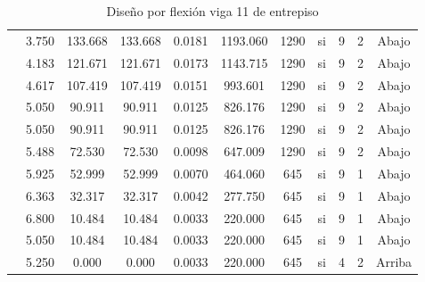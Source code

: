 \begin{table}[H]
{\begin{tabular}{|c|c|c|c|c|c|c|c|c|c|c|}
\cline{2-11}          & 3.750 & 133.668 & 133.668 & 0.0181 & 1193.060 & 1290  & si    & 9     & 2     & Abajo \bigstrut\\
\cline{2-11}          & 4.183 & 121.671 & 121.671 & 0.0173 & 1143.715 & 1290  & si    & 9     & 2     & Abajo \bigstrut\\
\cline{2-11}          & 4.617 & 107.419 & 107.419 & 0.0151 & 993.601 & 1290  & si    & 9     & 2     & Abajo \bigstrut\\
\cline{2-11}          & 5.050 & 90.911 & 90.911 & 0.0125 & 826.176 & 1290  & si    & 9     & 2     & Abajo \bigstrut\\
\cline{2-11}          & 5.050 & 90.911 & 90.911 & 0.0125 & 826.176 & 1290  & si    & 9     & 2     & Abajo \bigstrut\\
\cline{2-11}          & 5.488 & 72.530 & 72.530 & 0.0098 & 647.009 & 1290  & si    & 9     & 2     & Abajo \bigstrut\\
\cline{2-11}          & 5.925 & 52.999 & 52.999 & 0.0070 & 464.060 & 645   & si    & 9     & 1     & Abajo \bigstrut\\
\cline{2-11}          & 6.363 & 32.317 & 32.317 & 0.0042 & 277.750 & 645   & si    & 9     & 1     & Abajo \bigstrut\\
\cline{2-11}          & 6.800 & 10.484 & 10.484 & 0.0033 & 220.000 & 645   & si    & 9     & 1     & Abajo \bigstrut\\
\cline{2-11}          & 5.050 & 10.484 & 10.484 & 0.0033 & 220.000 & 645   & si    & 9     & 1     & Abajo \bigstrut\\
\cline{2-11}          & 5.250 & 0.000 & 0.000 & 0.0033 & 220.000 & 645   & si    & 4     & 2     & Arriba \bigstrut\\
    \hline
    \end{tabular}}%
  \caption{Diseño por flexión viga 11 de entrepiso}
  \label{tab:F V11E}
\end{table}%
